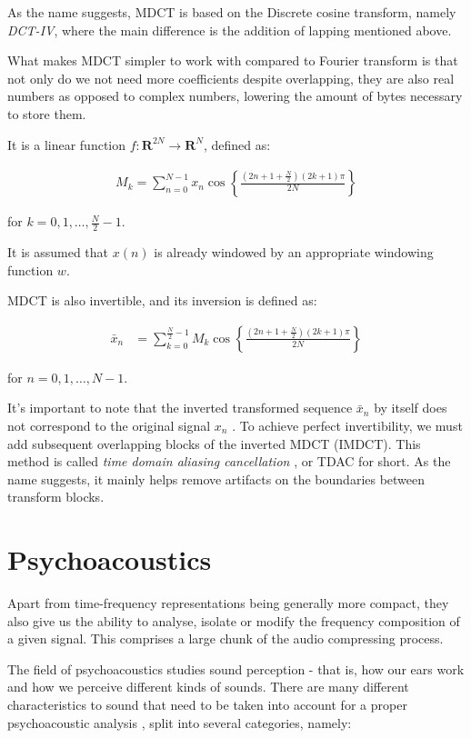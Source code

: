 As the name suggests, MDCT is based on the Discrete cosine transform, namely \emph{DCT-IV}, where the main difference is the addition of lapping mentioned above.

What makes MDCT simpler to work with compared to Fourier transform is that not only do we not need more coefficients despite overlapping, they are also real numbers as opposed to complex numbers, lowering the amount of bytes necessary to store them.

It is a linear function $f: \mathbf{R}^{2N} \rightarrow \mathbf{R}^N$, defined as: \cite{Babu2013FastAE}

\begin{align}
M_k = \sum_{n=0}^{N-1} x_n \cos \left\lbrace \frac{(2n+1+ \frac{N}{2} )(2k+1)\pi }{2N} \right\rbrace
\end{align}

for $k = 0, 1, \ldots, \frac{N}{2}-1$.

It is assumed that $x(n)$ is already windowed by an appropriate windowing function $w$.

MDCT is also invertible, and its inversion is defined as:

\begin{align}
\bar{x}_n &= \sum_{k=0}^{\frac{N}{2}-1} M_k \cos \left\lbrace \frac{(2n+1+ \frac{N}{2} )(2k+1)\pi }{2N} \right\rbrace
\end{align}

for $n = 0, 1, \ldots, N-1$.

It's important to note that the inverted transformed sequence $\bar{x}_n$ by itself does not correspond to the original signal $x_n$ \cite{prince_1986_tdac_1}. To achieve perfect invertibility, we must add subsequent overlapping blocks of the inverted MDCT (IMDCT). This method is called \emph{time domain aliasing cancellation} \cite{prince_1986_tdac_2}, or TDAC for short. As the name suggests, it mainly helps remove artifacts on the boundaries between transform blocks.

\section{Psychoacoustics}
Apart from time-frequency representations being generally more compact, they also give us the ability to analyse, isolate or modify the frequency composition of a given signal. This comprises a large chunk of the audio compressing process.

The field of psychoacoustics studies sound perception - that is, how our ears work and how we perceive different kinds of sounds. There are many different characteristics to sound that need to be taken into account for a proper psychoacoustic analysis \cite{olson1967music}, split into several categories, namely:

